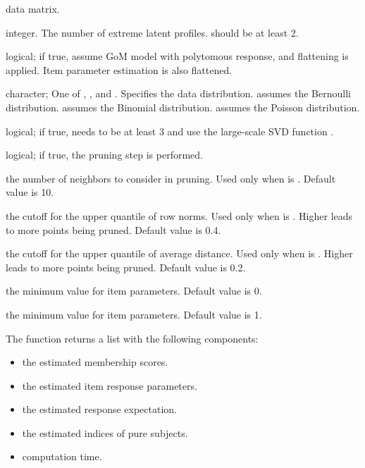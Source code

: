 \documentclass[a4paper]{book}
\begin{document}
\begin{Arguments}
\begin{ldescription}
\item[\code{R}] data matrix.

\item[\code{K}] integer. The number of extreme latent profiles.  should be at least 2.

\item[\code{pol}] logical; if true, assume GoM model with polytomous response, and flattening is applied. Item parameter estimation  is also flattened.

\item[\code{dist}] character; One of , , and . Specifies the data distribution.
 assumes the Bernoulli distribution.
 assumes the Binomial distribution.
 assumes the Poisson distribution.

\item[\code{large}] logical; if true,  needs to be at least 3 and use the large-scale SVD function .

\item[\code{prune}] logical; if true, the pruning step is performed.

\item[\code{r}] the number of neighbors to consider in pruning. Used only when  is . Default value is 10.

\item[\code{q}] the cutoff for the upper quantile of row norms. Used only when  is . Higher  leads to more points being pruned. Default value is 0.4.

\item[\code{e}] the cutoff for the upper quantile of average distance. Used only when  is . Higher  leads to more points being pruned. Default value is 0.2.

\item[\code{lower}] the minimum value for item parameters. Default value is 0.

\item[\code{upper}] the minimum value for item parameters. Default value is 1.
\end{ldescription}
\end{Arguments}
%
\begin{Value}
The function returns a list with the following components:
\begin{itemize}

\item{}  the estimated membership scores.
\item{}  the estimated item response parameters.
\item{}  the estimated response expectation.
\item{}  the estimated indices of pure subjects.
\item{}  computation time.

\end{itemize}

\end{Value}
\end{document}
